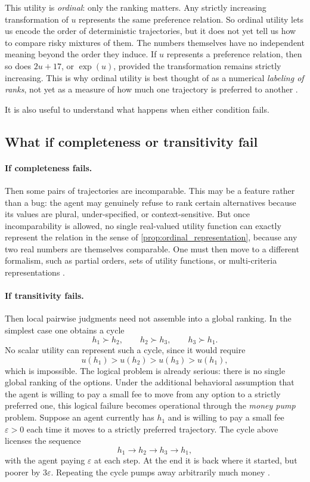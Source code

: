 \documentclass[11pt]{article}
\newcommand{\strictpref}{\succ}
\begin{document}
This utility is \emph{ordinal}: only the ranking matters. Any strictly
increasing transformation of $u$ represents the same preference relation. So
ordinal utility lets us encode the order of deterministic trajectories, but it
does not yet tell us how to compare risky mixtures of them. The numbers
themselves have no independent meaning beyond the order they induce. If $u$
represents a preference relation, then so does $2u+17$, or $\exp(u)$, provided
the transformation remains strictly increasing. This is why ordinal utility is
best thought of as a numerical \emph{labeling of ranks}, not yet as a measure of
how much one trajectory is preferred to another \citep{fishburn1970utility}.

It is also useful to understand what happens when either condition fails.

\subsection*{What if completeness or transitivity fail}

\paragraph{If completeness fails.}
Then some pairs of trajectories are incomparable. This may be a feature rather
than a bug: the agent may genuinely refuse to rank certain alternatives because
its values are plural, under-specified, or context-sensitive. But once
incomparability is allowed, no single real-valued utility function can exactly
represent the relation in the sense of
\cref{prop:ordinal_representation}, because any two real numbers are
themselves comparable. One must then move to a different formalism, such as
partial orders, sets of utility functions, or multi-criteria representations
\citep{aumann1962utility}.

\paragraph{If transitivity fails.}
Then local pairwise judgments need not assemble into a global ranking. In the
simplest case one obtains a cycle
\[
h_1 \strictpref h_2,\qquad h_2 \strictpref h_3,\qquad h_3 \strictpref h_1.
\]
No scalar utility can represent such a cycle, since it would require
\[
u(h_1)>u(h_2)>u(h_3)>u(h_1),
\]
which is impossible.
The logical problem is already serious: there is no single global ranking of the
options. Under the additional behavioral assumption that the agent is willing to
pay a small fee to move from any option to a strictly preferred one, this
logical failure becomes operational through the \emph{money pump} problem.
Suppose an agent currently has $h_1$ and is willing to pay a small fee
$\varepsilon>0$ each time it moves to a strictly preferred trajectory. The
cycle above licenses the sequence
\[
h_1 \to h_2 \to h_3 \to h_1,
\]
with the agent paying $\varepsilon$ at each step. At the end it is back where
it started, but poorer by $3\varepsilon$. Repeating the cycle pumps away
arbitrarily much money \citep{gustafsson2010money}.
\end{document}

